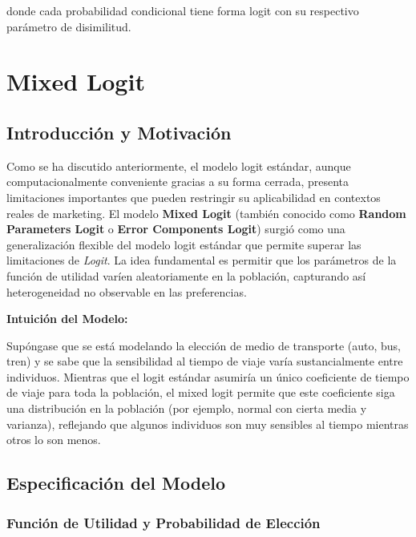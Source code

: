 \documentclass[
]{book}
\begin{document}
donde cada probabilidad condicional tiene forma logit con su respectivo parámetro de disimilitud.

\hypertarget{mixed-logit}{%
\section{Mixed Logit}\label{mixed-logit}}

\hypertarget{introducciuxf3n-y-motivaciuxf3n}{%
\subsection{Introducción y Motivación}\label{introducciuxf3n-y-motivaciuxf3n}}

Como se ha discutido anteriormente, el modelo logit estándar, aunque computacionalmente conveniente gracias a su forma cerrada, presenta limitaciones importantes que pueden restringir su aplicabilidad en contextos reales de marketing. El modelo \textbf{Mixed Logit} (también conocido como \textbf{Random Parameters Logit} o \textbf{Error Components Logit}) surgió como una generalización flexible del modelo logit estándar que permite superar las limitaciones de \emph{Logit}. La idea fundamental es permitir que los parámetros de la función de utilidad varíen aleatoriamente en la población, capturando así heterogeneidad no observable en las preferencias.

\textbf{Intuición del Modelo:}

Supóngase que se está modelando la elección de medio de transporte (auto, bus, tren) y se sabe que la sensibilidad al tiempo de viaje varía sustancialmente entre individuos. Mientras que el logit estándar asumiría un único coeficiente de tiempo de viaje para toda la población, el mixed logit permite que este coeficiente siga una distribución en la población (por ejemplo, normal con cierta media y varianza), reflejando que algunos individuos son muy sensibles al tiempo mientras otros lo son menos.

\hypertarget{especificaciuxf3n-del-modelo}{%
\subsection{Especificación del Modelo}\label{especificaciuxf3n-del-modelo}}

\hypertarget{funciuxf3n-de-utilidad-y-probabilidad-de-elecciuxf3n}{%
\subsubsection{Función de Utilidad y Probabilidad de Elección}\label{funciuxf3n-de-utilidad-y-probabilidad-de-elecciuxf3n}}
\end{document}
